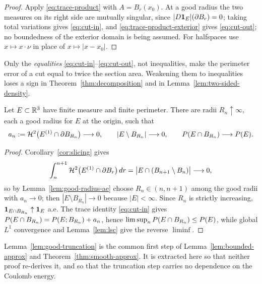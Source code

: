 \begin{proof}
Apply \eqref{eq:trace-product} with $A=B_r(x_0)$.  At a good radius the two
measures on its right side are mutually singular, since
$|D\mathbf 1_{E}|(\partial B_r)=0$; taking total variations gives \eqref{eq:cut-in},
and \eqref{eq:trace-product-exterior} gives \eqref{eq:cut-out}; no
boundedness of the exterior domain is being assumed.  For halfspaces use
$x\mapsto x\cdot\nu$ in place of
$x\mapsto|x-x_0|$.
\end{proof}

\begin{fnote}\label{fnote:exact-cut}
Only the \emph{equalities} \eqref{eq:cut-in}--\eqref{eq:cut-out}, not
inequalities, make the perimeter error of a cut equal to twice the section
area.  Weakening them to inequalities loses a sign in
Theorem~\ref{thm:decomposition} and in Lemma~\ref{lem:two-sided-density}.
\end{fnote}

\begin{lemma}\label{lem:good-truncation}
Let $E\subset\mathbb R^3$ have finite measure and finite perimeter.  There are radii
$R_n\uparrow\infty$, each a good radius for $E$ at the origin, such that
\begin{equation}\label{eq:good-truncation}
  a_n:=\mathcal H^2\bigl(E^{(1)}\cap\partial B_{R_n}\bigr)\longrightarrow0,
  \qquad
  |E\setminus B_{R_n}|\longrightarrow0,
  \qquad
  P(E\cap B_{R_n})\longrightarrow P(E).
\end{equation}
\end{lemma}

\begin{proof}
Corollary~\ref{cor:slicing} gives
\[
  \int_n^{n+1}\mathcal H^2\bigl(E^{(1)}\cap\partial B_r\bigr)\,dr
  =\bigl|E\cap(B_{n+1}\setminus B_n)\bigr|\longrightarrow0 ,
\]
so by Lemma~\ref{lem:good-radius-ae} choose $R_n\in(n,n+1)$ among the good
radii with $a_n\to0$; then $|E\setminus B_{R_n}|\to0$ because $|E|<\infty$.
Since $R_n$ is strictly increasing, $\mathbf 1_{E\cap B_{R_n}}\uparrow\mathbf 1_{E}$ a.e.
The trace identity \eqref{eq:cut-in} gives
$P(E\cap B_{R_n})=P(E;B_{R_n})+a_n$, hence
$\limsup_nP(E\cap B_{R_n})\le P(E)$, while global $L^1$ convergence and
Lemma~\ref{lem:lsc} give the reverse $\liminf$.
\end{proof}

\begin{fnote}\label{fnote:good-truncation-shared}
Lemma~\ref{lem:good-truncation} is the common first step of
Lemma~\ref{lem:bounded-approx} and Theorem~\ref{thm:smooth-approx}.  It is
extracted here so that neither proof re-derives it, and so that the
truncation step carries no dependence on the Coulomb energy.
\end{fnote}

